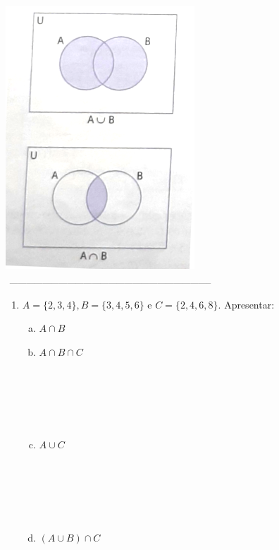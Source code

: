 \documentclass[a4paper,14pt]{article}
\begin{document}
\begin{multicols}{2}
	\includegraphics[width=0.7\linewidth]{imagens_6FMA91/imagem2} \\
	\noindent\textsubscript{~--------------------------------------------------------------------------}	
    	\begin{enumerate}
    		\item $A = \{2, 3, 4\}, B = \{3, 4, 5, 6\}$ e $C = \{2, 4, 6, 8\}$. Apresentar:
    		\begin{enumerate}[a)]
    			\item $A \cap B$ 
    			\item $A \cap B \cap C$ \\\\\\\\\\\\
    			\item $A \cup C$ \\\\\\\\\\\\
    			\item $(A \cup B) \cap C$ \\\\\\\\\\\\

\end{enumerate}
\end{enumerate}
\end{multicols}
\end{document}

